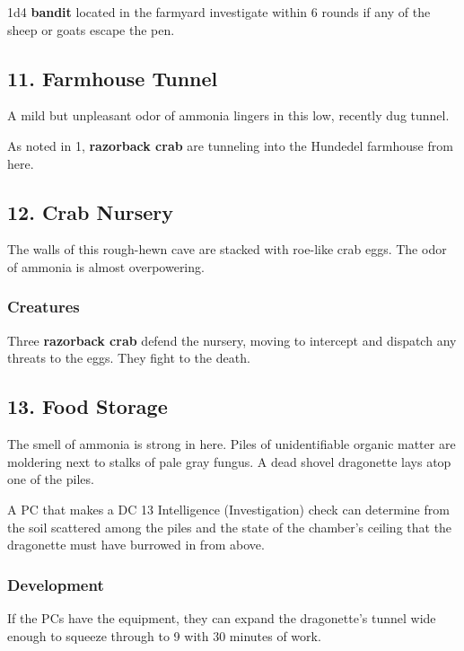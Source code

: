 \documentclass[10pt,a4paper,twoside,bg=print,twocolumn,openany,nodeprecatedcode]{dndbook}
\begin{document}
1d4 \textbf{bandit} located in the farmyard investigate within 6 rounds if any of the sheep or goats escape the pen.

\subsection{11. Farmhouse Tunnel}
\begin{DndReadAloud}{}
A mild but unpleasant odor of ammonia lingers in this low, recently dug tunnel.

\end{DndReadAloud}

As noted in 1, \textbf{razorback crab} are tunneling into the Hundedel farmhouse from here.

\subsection{12. Crab Nursery}
\begin{DndReadAloud}{}
The walls of this rough-hewn cave are stacked with roe-like crab eggs. The odor of ammonia is almost overpowering.

\end{DndReadAloud}

\subsubsection{Creatures}
Three \textbf{razorback crab} defend the nursery, moving to intercept and dispatch any threats to the eggs. They fight to the death.

\subsection{13. Food Storage}
\begin{DndReadAloud}{}
The smell of ammonia is strong in here. Piles of unidentifiable organic matter are moldering next to stalks of pale gray fungus. A dead shovel dragonette lays atop one of the piles.

\end{DndReadAloud}

A PC that makes a DC 13 Intelligence (Investigation) check can determine from the soil scattered among the piles and the state of the chamber's ceiling that the dragonette must have burrowed in from above.

\subsubsection{Development}
If the PCs have the equipment, they can expand the dragonette's tunnel wide enough to squeeze through to 9 with 30 minutes of work.
\end{document}

